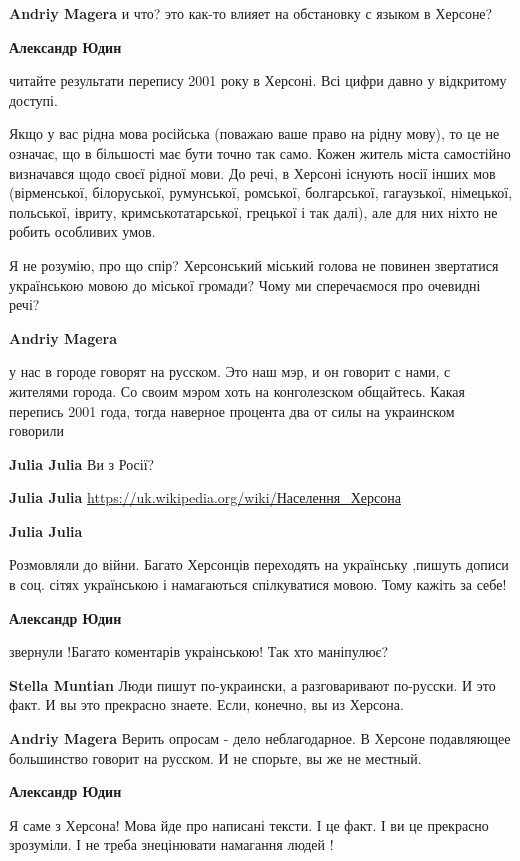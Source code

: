 \begin{itemize}
\begin{itemize}
\textbf{Andriy Magera} и что? это как-то влияет на обстановку с языком в Херсоне?

\textbf{Александр Юдин} 

читайте результати перепису 2001 року в Херсоні. Всі цифри давно у відкритому
доступі.

Якщо у вас рідна мова російська (поважаю ваше право на рідну мову), то це не
означає, що в більшості має бути точно так само. Кожен житель міста самостійно
визначався щодо своєї рідної мови. До речі, в Херсоні існують носії інших мов
(вірменської, білоруської, румунської, ромської, болгарської, гагаузької,
німецької, польської, івриту, кримськотатарської, грецької і так далі), але для
них ніхто не робить особливих умов.

Я не розумію, про що спір? Херсонський міський голова не повинен звертатися
українською мовою до міської громади? Чому ми сперечаємося про очевидні речі?

\textbf{Andriy Magera} 

у нас в городе говорят на русском. Это наш мэр, и он говорит с нами, с жителями
города. Со своим мэром хоть на конголезском общайтесь. Какая перепись 2001
года, тогда наверное процента два от силы на украинском говорили

\textbf{Julia Julia} Ви з Росії?

\textbf{Julia Julia} \url{https://uk.wikipedia.org/wiki/Населення_Херсона}

\textbf{Julia Julia} 

Розмовляли до війни. Багато Херсонців переходять на українську ,пишуть дописи в
соц. сітях українською і намагаються спілкуватися мовою. Тому кажіть за себе!

\textbf{Александр Юдин} 

звернули !Багато коментарів украінською! Так хто маніпулює?

\textbf{Stella Muntian} Люди пишут по-украински, а разговаривают по-русски. И это факт. И вы это прекрасно знаете. Если, конечно, вы из Херсона.


\textbf{Andriy Magera} Верить опросам - дело неблагодарное. В Херсоне подавляющее большинство говорит на русском. И не спорьте, вы же не местный.

\textbf{Александр Юдин} 

Я саме з Херсона! Мова йде про написані тексти. І це факт. І ви це прекрасно
зрозуміли. І не треба знецінювати намагання людей !


\end{itemize}
\end{itemize}
